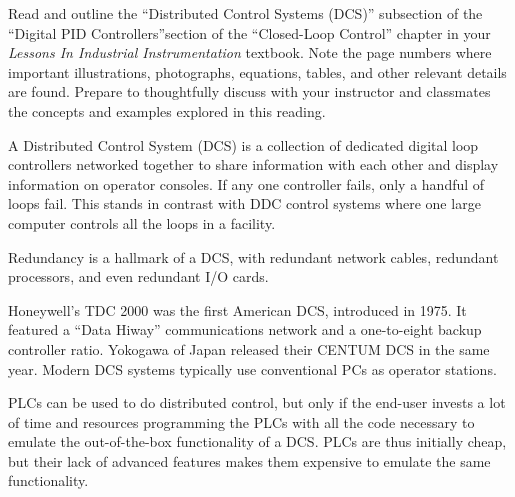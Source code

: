

Read and outline the ``Distributed Control Systems (DCS)'' subsection of the ``Digital PID Controllers''section of the ``Closed-Loop Control'' chapter in your {\it Lessons In Industrial Instrumentation} textbook.  Note the page numbers where important illustrations, photographs, equations, tables, and other relevant details are found.  Prepare to thoughtfully discuss with your instructor and classmates the concepts and examples explored in this reading.














A Distributed Control System (DCS) is a collection of dedicated digital loop controllers networked together to share information with each other and display information on operator consoles.  If any one controller fails, only a handful of loops fail.  This stands in contrast with DDC control systems where one large computer controls all the loops in a facility.

\vskip 10pt

Redundancy is a hallmark of a DCS, with redundant network cables, redundant processors, and even redundant I/O cards.

\vskip 10pt

Honeywell's TDC 2000 was the first American DCS, introduced in 1975.  It featured a ``Data Hiway'' communications network and a one-to-eight backup controller ratio.  Yokogawa of Japan released their CENTUM DCS in the same year.  Modern DCS systems typically use conventional PCs as operator stations.

\vskip 10pt

PLCs can be used to do distributed control, but only if the end-user invests a lot of time and resources programming the PLCs with all the code necessary to emulate the out-of-the-box functionality of a DCS.  PLCs are thus initially cheap, but their lack of advanced features makes them expensive to emulate the same functionality.










